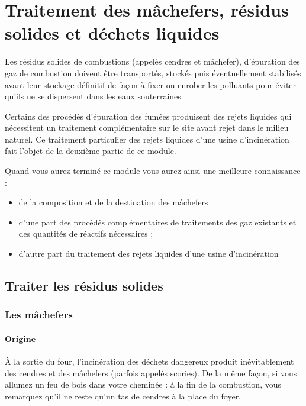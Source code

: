 
\chapter{Traitement des mâchefers, résidus solides et déchets liquides}
Les résidus solides de combustions (appelés cendres et mâchefer), d’épuration des gaz de combustion doivent être transportés, stockés puis éventuellement stabilisés avant leur stockage définitif de façon à fixer ou enrober les polluants pour éviter qu’ils ne se dispersent dans les eaux souterraines.
\vspace{0.3cm}

Certains des procédés d’épuration des fumées produisent des rejets liquides qui nécessitent un traitement complémentaire sur le site avant rejet dans le milieu naturel. Ce traitement particulier des rejets liquides d’une usine d’incinération fait l’objet de la deuxième partie de ce module.
\vspace{0.3cm}

Quand vous aurez terminé ce module vous aurez ainsi une meilleure connaissance :


\begin{itemize}
\item de la composition et de la destination des mâchefers
\item d’une part des procédés complémentaires de traitements des gaz existants et des quantités de réactifs nécessaires ;
\item d’autre part du traitement des rejets liquides d’une usine d’incinération
\end{itemize}

\section{Traiter les résidus solides}

\subsection{Les mâchefers}

\subsubsection{Origine}

À la sortie du four, l’incinération des déchets dangereux produit inévitablement des cendres et des mâchefers (parfois appelés scories). De la même façon, si vous allumez un feu de bois dans votre cheminée : à la fin de la combustion, vous remarquez qu’il ne reste qu’un tas de cendres à la place du foyer.

